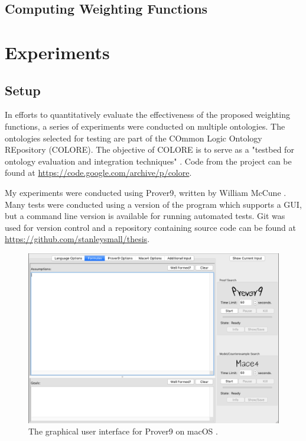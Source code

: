 \documentclass{article}
\begin{document}
		\subsection{Computing Weighting Functions}

	\newpage
	\section{Experiments}

\subsection{Setup}
In efforts to quantitatively evaluate the effectiveness of the proposed weighting functions, a series of experiments were conducted on multiple ontologies. The ontologies selected for testing are part of the COmmon Logic Ontology REpository (COLORE). The objective of COLORE is to serve as a "testbed for ontology evaluation and integration techniques" \cite{gruninger2012specifying}. Code from the project can be found at \url{https://code.google.com/archive/p/colore}. 

My experiments were conducted using Prover9, written by William McCune \cite{mccune2005prover9}. Many tests were conducted using a version of the program which supports a GUI, but a command line version is available for running automated tests. 
Git was used for version control and a repository containing source code can be found at \url{https://github.com/stanleysmall/thesis}.

\begin{figure}[h]
\centering
\includegraphics[width=6in]{prover9}
\caption{The graphical user interface for Prover9 on macOS \cite{mccune2005prover9}.}
\label{fig:prover9}
\end{figure}
		
\end{document}
